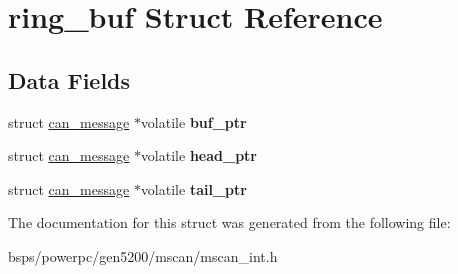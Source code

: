 \hypertarget{structring__buf}{}\section{ring\+\_\+buf Struct Reference}
\label{structring__buf}
\subsection*{Data Fields}
\begin{DoxyCompactItemize}
\item 
\mbox{\label{structring__buf_aaaa78f0682a17f1acb327fce7045c07d}} 
struct \mbox{\hyperlink{unioncan__message}{can\+\_\+message}} $\ast$volatile {\bfseries buf\+\_\+ptr}
\item 
\mbox{\label{structring__buf_a89a38faecbaef10200c66ee8c260abe6}} 
struct \mbox{\hyperlink{unioncan__message}{can\+\_\+message}} $\ast$volatile {\bfseries head\+\_\+ptr}
\item 
\mbox{\label{structring__buf_a636fdd94089092f226f1725e58596f08}} 
struct \mbox{\hyperlink{unioncan__message}{can\+\_\+message}} $\ast$volatile {\bfseries tail\+\_\+ptr}
\end{DoxyCompactItemize}


The documentation for this struct was generated from the following file\+:\begin{DoxyCompactItemize}
\item 
bsps/powerpc/gen5200/mscan/mscan\+\_\+int.\+h\end{DoxyCompactItemize}
